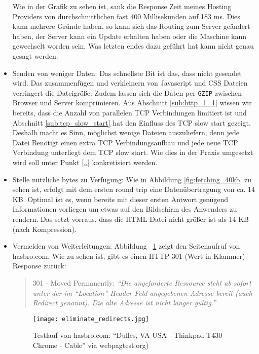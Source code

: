 \begin{itemize}
			Wie in der Grafik zu sehen ist, sank die Response Zeit meines Hosting Providers von durchschnittlichen fast 400 Millisekunden auf 183 ms. Dies kann mehrere Gründe haben, so kann sich das Routing zum Server geändert haben, der Server kann ein Update erhalten haben oder die Maschine kann gewechselt worden sein. Was letzten endes dazu geführt hat kann nicht genau gesagt werden.

			\item Senden von weniger Daten: Das schnellste Bit ist das, dass nicht gesendet wird. Das zusammenfügen und verkleinern von Javascript und CSS Dateien verringert die Dateigröße. Zudem lassen sich die Daten per \texttt{GZIP} zwischen Browser und Server komprimieren. Aus Abschnitt \ref{sub:http_1_1} wissen wir bereits, dass die Anzahl von parallelen TCP Verbindungen limitiert ist und Abschnitt \ref{sub:tcp_slow_start} hat den Einfluss des TCP slow start gezeigt. Deshalb macht es Sinn, möglichst wenige Dateien auszuliefern, denn jede Datei Benötigt einen extra TCP Verbindungsaufbau und jede neue TCP Verbindung unterliegt dem TCP slow start. Wie dies in der Praxis umgesetzt wird soll unter Punkt \ref{..} konkretisiert werden.

			\item Stelle nützliche bytes zu Verfügung: Wie in Abbildung \ref{fig:fetching_40kb} zu sehen ist, erfolgt mit dem ersten round trip eine Datenübertragung von ca. 14 KB. Optimal ist es, wenn bereits mit dieser ersten Antwort genügend Informationen vorliegen um etwas auf den Bildschirm des Anwenders zu rendern. Das setzt vorraus, dass die HTML Datei nicht größer ist als 14 KB (nach Kompression).

			\item Vermeiden von Weiterleitungen: Abbildung ~\ref{fig:eliminate_redirects} zeigt den Seitenaufruf von hasbro.com. Wie zu sehen ist, gibt es einen HTTP 301 (Wert in Klammer) Response zurück: 

			\begin{quote}
				301 - Moved Permanently: \textit{"`Die angeforderte Ressource steht ab sofort unter der im "`Location"'-Header-Feld angegebenen Adresse bereit (auch Redirect genannt). Die alte Adresse ist nicht länger gültig."'} \autocite{wikipediaHTTP}
			\end{quote}

			\begin{figure}[htbp]
				\begin{center}
					\texttt{[image: eliminate\_redirects.jpg]}
					\caption{Testlauf von hasbro.com: "`Dulles, VA USA - Thinkpad T430 - Chrome - Cable"' via webpagtest.org)}
					\label{fig:eliminate_redirects}
				\end{center}
			\end{figure}
			

\end{itemize}
